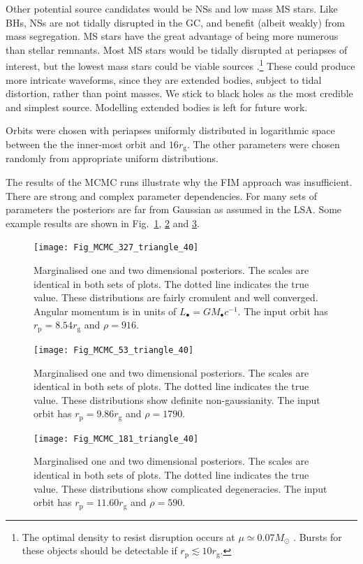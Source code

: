 \documentclass[useAMS,usedcolumn,usegraphicx,usenatbib]{mn2e}
\newcommand{\figref}[1]{Fig.~\ref{fig:#1}}
\newcommand{\sub}[1]{\ensuremath{_\mathrm{#1}}}
\begin{document}
Other potential source candidates would be NSs and low mass MS stars. Like BHs, NSs are not tidally disrupted in the GC, and benefit (albeit weakly) from mass segregation. MS stars have the great advantage of being more numerous than stellar remnants. Most MS stars would be tidally disrupted at periapses of interest, but the lowest mass stars could be viable sources \citep{Freitag2003, Amaro-Seoane2012c}.\footnote{The optimal density to resist disruption occurs at $\mu \simeq 0.07 M_\odot$ \citep{Chabrier2000}. Bursts for these objects should be detectable if $r\sub{p} \lesssim 10 r\sub{g}$.} These could produce more intricate waveforms, since they are extended bodies, subject to tidal distortion, rather than point masses. We stick to black holes as the most credible and simplest source. Modelling extended bodies is left for future work.

Orbits were chosen with periapses uniformly distributed in logarithmic space between the the inner-most orbit and $16 r\sub{g}$. The other parameters were chosen randomly from appropriate uniform distributions. 

The results of the MCMC runs illustrate why the FIM approach was insufficient. There are strong and complex parameter dependencies. For many sets of parameters the posteriors are far from Gaussian as assumed in the LSA. Some example results are shown in \figref{MCMC-1}, \ref{fig:MCMC-2} and \ref{fig:MCMC-3}.
\begin{figure}
\begin{center}
   \texttt{[image: Fig\_MCMC\_327\_triangle\_40]}
\caption{Marginalised one and two dimensional posteriors. The scales are identical in both sets of plots. The dotted line indicates the true value. These distributions are fairly cromulent and well converged. Angular momentum is in units of $L_\bullet = GM_\bullet c^{-1}$. The input orbit has $r\sub{p} = 8.54 r\sub{g}$ and $\rho = 916$.\label{fig:MCMC-1}}
\end{center}
\end{figure}
\begin{figure}
\begin{center}
   \texttt{[image: Fig\_MCMC\_53\_triangle\_40]}
\caption{Marginalised one and two dimensional posteriors. The scales are identical in both sets of plots. The dotted line indicates the true value. These distributions show definite non-gaussianity. The input orbit has $r\sub{p} = 9.86 r\sub{g}$ and $\rho = 1790$.\label{fig:MCMC-2}}
\end{center}
\end{figure}
\begin{figure}
\begin{center}
   \texttt{[image: Fig\_MCMC\_181\_triangle\_40]}
\caption{Marginalised one and two dimensional posteriors. The scales are identical in both sets of plots. The dotted line indicates the true value. These distributions show complicated degeneracies. The input orbit has $r\sub{p} = 11.60 r\sub{g}$ and $\rho = 590$.}
\label{fig:MCMC-3}
\end{center}
\end{figure}
\end{document}
